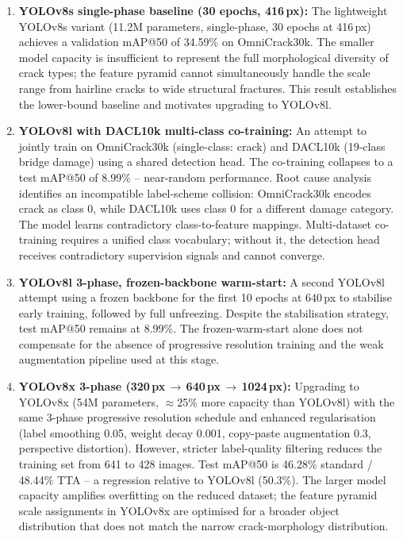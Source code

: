 \documentclass[12pt,a4paper]{article}
\begin{document}
\begin{enumerate}[leftmargin=1.5cm]

\item \textbf{YOLOv8s single-phase baseline (30 epochs, 416\,px):}
The lightweight YOLOv8s variant (11.2M parameters, single-phase, 30 epochs at 416\,px) achieves a validation mAP@50 of 34.59\% on OmniCrack30k. The smaller model capacity is insufficient to represent the full morphological diversity of crack types; the feature pyramid cannot simultaneously handle the scale range from hairline cracks to wide structural fractures. This result establishes the lower-bound baseline and motivates upgrading to YOLOv8l.

\item \textbf{YOLOv8l with DACL10k multi-class co-training:}
An attempt to jointly train on OmniCrack30k (single-class: crack) and DACL10k (19-class bridge damage) using a shared detection head. The co-training collapses to a test mAP@50 of 8.99\% -- near-random performance. Root cause analysis identifies an incompatible label-scheme collision: OmniCrack30k encodes crack as class 0, while DACL10k uses class 0 for a different damage category. The model learns contradictory class-to-feature mappings. Multi-dataset co-training requires a unified class vocabulary; without it, the detection head receives contradictory supervision signals and cannot converge.

\item \textbf{YOLOv8l 3-phase, frozen-backbone warm-start:}
A second YOLOv8l attempt using a frozen backbone for the first 10 epochs at 640\,px to stabilise early training, followed by full unfreezing. Despite the stabilisation strategy, test mAP@50 remains at 8.99\%. The frozen-warm-start alone does not compensate for the absence of progressive resolution training and the weak augmentation pipeline used at this stage.

\item \textbf{YOLOv8x 3-phase (320\,px\,$\to$\,640\,px\,$\to$\,1024\,px):}
Upgrading to YOLOv8x (54M parameters, $\approx$25\% more capacity than YOLOv8l) with the same 3-phase progressive resolution schedule and enhanced regularisation (label smoothing 0.05, weight decay 0.001, copy-paste augmentation 0.3, perspective distortion). However, stricter label-quality filtering reduces the training set from 641 to 428 images. Test mAP@50 is 46.28\% standard / 48.44\% TTA -- a regression relative to YOLOv8l (50.3\%). The larger model capacity amplifies overfitting on the reduced dataset; the feature pyramid scale assignments in YOLOv8x are optimised for a broader object distribution that does not match the narrow crack-morphology distribution.

\end{enumerate}
\end{document}
